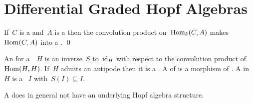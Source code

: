 \documentclass[a4paper,10pt,headings=standardclasses]{scrartcl}
\begin{document}
\section{Differential Graded Hopf Algebras}

\begin{lemma}
  If~$C$ is a {\dgc} and~$A$ is a {\dga} then the convolution product on~$\operatorname{Hom}_k(C,A)$ makes~$\operatorname{Hom}(C,A)$ into a {\dga}.
  \qed
\end{lemma}


\begin{definition}
  An  for a~{\dgb}~$H$ is an inverse~$S$ to~$\operatorname{id}_H$ with respect to the convolution product of~$\operatorname{Hom}(H,H)$.
  If~$H$ admits an antipode then it is a .
  A  of {\dghs} is a morphism of {\dgbs}.
  A  in~$H$ is a {\dgbi}~$I$ with~$S(I) \subseteq I$.
\end{definition}

\begin{warning}
  A {\dgh} does in general not have an underlying Hopf algebra structure.
\end{warning}
\end{document}
